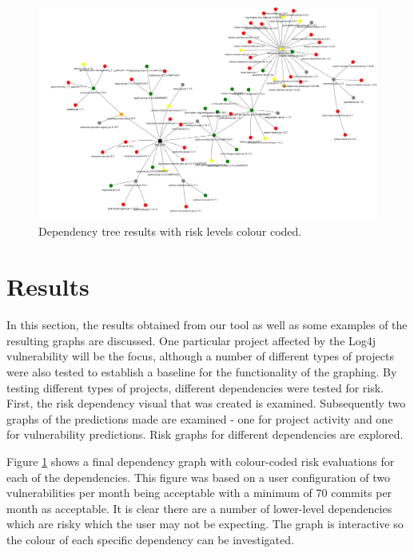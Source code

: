 \documentclass[conference]{IEEEtran}
\begin{document}
\begin{figure}
    \centering
    \includegraphics[scale=0.5]{dependency.png}
    \caption{Dependency tree results with risk levels colour coded.} 
    \label{fig:tree}
\end{figure}

\section{Results}
In this section, the results obtained from our tool as well as some examples of the resulting graphs are discussed. One particular project \cite{noauthor_logging-log4j-sampleslog4j-server_nodate} affected by the Log4j vulnerability will be the focus, although a number of different types of projects were also tested to establish a baseline for the functionality of the graphing. By testing different types of projects, different dependencies were tested for risk. First, the risk dependency visual that was created is examined. Subsequently two graphs of the predictions made are examined - one for project activity and one for vulnerability predictions. Risk graphs for different dependencies are explored. 

Figure \ref{fig:tree} shows a final dependency graph with colour-coded risk evaluations for each of the dependencies. This figure was based on a user configuration of two vulnerabilities per month being acceptable with a minimum of 70 commits per month as acceptable. It is clear there are a number of lower-level dependencies which are risky which the user may not be expecting. The graph is interactive so the colour of each specific dependency can be investigated. 
\end{document}
